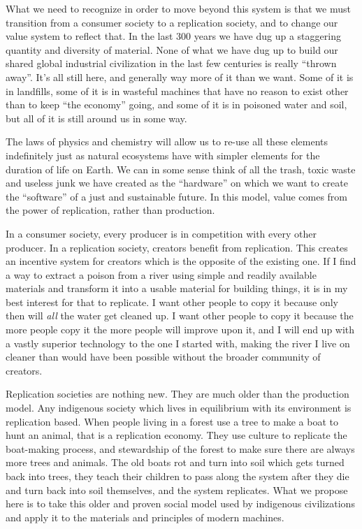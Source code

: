 What we need to recognize in order to move beyond this system is that we
must transition from a consumer society to a replication society, and to
change our value system to reflect that. In the last 300 years we have
dug up a staggering quantity and diversity of material. None of what we
have dug up to build our shared global industrial civilization in the
last few centuries is really ``thrown away''. It's all still here, and
generally way more of it than we want. Some of it is in landfills, some
of it is in wasteful machines that have no reason to exist other than to
keep ``the economy'' going, and some of it is in poisoned water and
soil, but all of it is still around us in some way.

The laws of physics and chemistry will allow us to re-use all these
elements indefinitely just as natural ecosystems have with simpler
elements for the duration of life on Earth. We can in some sense think
of all the trash, toxic waste and useless junk we have created as the
``hardware'' on which we want to create the ``software'' of a just and
sustainable future. In this model, value comes from the power of
replication, rather than production.

In a consumer society, every producer is in competition with every other
producer. In a replication society, creators benefit from replication.
This creates an incentive system for creators which is the opposite of
the existing one. If I find a way to extract a poison from a river using
simple and readily available materials and transform it into a usable
material for building things, it is in my best interest for that to
replicate. I want other people to copy it because only then will
\emph{all} the water get cleaned up. I want other people to copy it
because the more people copy it the more people will improve upon it,
and I will end up with a vastly superior technology to the one I started
with, making the river I live on cleaner than would have been possible
without the broader community of creators.

Replication societies are nothing new. They are much older than the
production model. Any indigenous society which lives in equilibrium with
its environment is replication based. When people living in a forest use
a tree to make a boat to hunt an animal, that is a replication economy.
They use culture to replicate the boat-making process, and stewardship
of the forest to make sure there are always more trees and animals. The
old boats rot and turn into soil which gets turned back into trees, they
teach their children to pass along the system after they die and turn
back into soil themselves, and the system replicates. What we propose
here is to take this older and proven social model used by indigenous
civilizations and apply it to the materials and principles of modern
machines.

